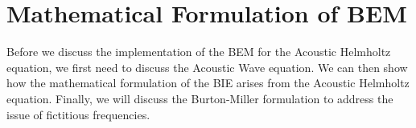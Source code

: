 \chapter{Mathematical Formulation of BEM}\label{chapter:mathematical-formulation-bem}

Before we discuss the implementation of the \ac{BEM} for the Acoustic Helmholtz equation, we first need to discuss the Acoustic Wave equation. We can then show how the mathematical formulation of the \ac{BIE} arises from the Acoustic Helmholtz equation. Finally, we will discuss the Burton-Miller formulation to address the issue of fictitious frequencies.




